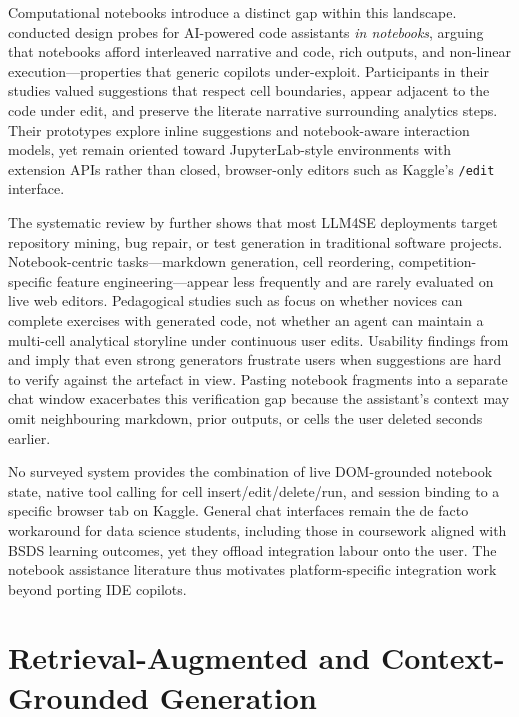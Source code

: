 Computational notebooks introduce a distinct gap within this landscape. \textcite{mcnutt2023notebookassistants} conducted design probes for AI-powered code assistants \emph{in notebooks}, arguing that notebooks afford interleaved narrative and code, rich outputs, and non-linear execution---properties that generic copilots under-exploit. Participants in their studies valued suggestions that respect cell boundaries, appear adjacent to the code under edit, and preserve the literate narrative surrounding analytics steps. Their prototypes explore inline suggestions and notebook-aware interaction models, yet remain oriented toward JupyterLab-style environments with extension APIs rather than closed, browser-only editors such as Kaggle's \texttt{/edit} interface.

The systematic review by \textcite{hou2024llm4se} further shows that most LLM4SE deployments target repository mining, bug repair, or test generation in traditional software projects. Notebook-centric tasks---markdown generation, cell reordering, competition-specific feature engineering---appear less frequently and are rarely evaluated on live web editors. Pedagogical studies such as \textcite{finnieansley2022codex} focus on whether novices can complete exercises with generated code, not whether an agent can maintain a multi-cell analytical storyline under continuous user edits. Usability findings from \textcite{vaithilingam2022expectation} and \textcite{mozannar2024reading} imply that even strong generators frustrate users when suggestions are hard to verify against the artefact in view. Pasting notebook fragments into a separate chat window exacerbates this verification gap because the assistant's context may omit neighbouring markdown, prior outputs, or cells the user deleted seconds earlier.

No surveyed system provides the combination of live \ac{DOM}-grounded notebook state, native tool calling for cell insert/edit/delete/run, and session binding to a specific browser tab on Kaggle. General chat interfaces remain the de facto workaround for data science students, including those in coursework aligned with \acf{BSDS} learning outcomes, yet they offload integration labour onto the user. The notebook assistance literature thus motivates platform-specific integration work beyond porting IDE copilots.

\section{Retrieval-Augmented and Context-Grounded Generation}
\label{sec:lit-rag}


